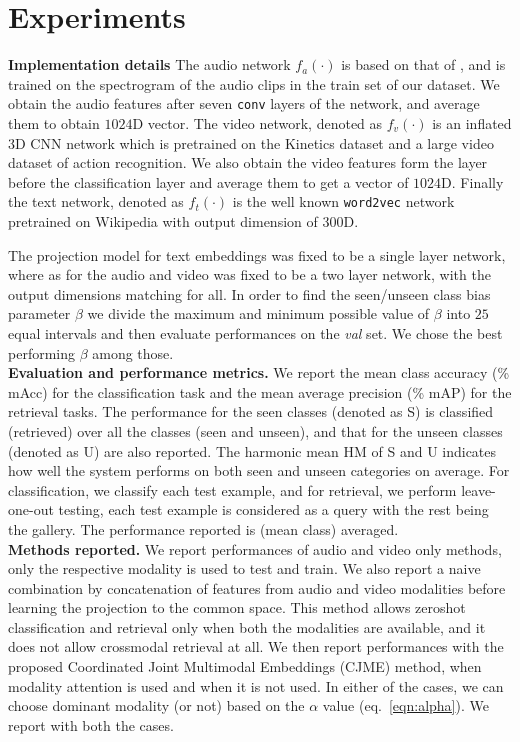 \section{Experiments}
\label{sec:experiments}
\noindent
\textbf{Implementation details}
The audio network $f_a(\cdot)$ is based on that of \cite{kumar2018knowledge}, and is trained on the spectrogram of the audio clips in the train set of our dataset. We obtain the audio features after seven \texttt{conv} layers of the network, and average them to obtain $1024$D vector. The video network, denoted as $f_v(\cdot)$ is an inflated 3D CNN network which is pretrained on the Kinetics dataset \cite{CarreiraCVPR2017} and a large video dataset of action recognition. We also obtain the  video features form the layer before the classification layer and average them to get a vector of $1024$D. Finally the text network, denoted as $f_t(\cdot)$ is the well known \texttt{word2vec} network pretrained on Wikipedia \cite{mikolov2018advances} with output dimension of $300$D.

The projection model for text embeddings was fixed to be a single layer network, where as for the audio and video was fixed to be a two layer network, with the output dimensions matching for all. In order to find the seen/unseen class bias parameter $\beta$ we divide the maximum and minimum possible value of $\beta$ into $25$ equal intervals and then evaluate performances on the \textit{val} set. We chose the best performing $\beta$ among those. 
\vspace{0.5em}\\
\textbf{Evaluation and performance metrics.}
We report the mean class accuracy (\% mAcc) for the classification task and the mean average precision (\% mAP) for the retrieval tasks. The performance for the seen classes (denoted as S) is classified (retrieved) over all the classes (seen and unseen), and that for the unseen classes (denoted as U) are also reported. The harmonic mean HM of S and U indicates how well the system performs on both seen and unseen categories on average. For classification, we classify each test example, and for retrieval, we perform leave-one-out testing, \ie each test example is considered as a query with the rest being the gallery. The performance reported is (mean class) averaged. 
\vspace{0.5em}\\
\textbf{Methods reported.}
We report performances of audio and video only methods, \ie only the respective modality is used to test and train. We also report a naive combination by concatenation of features from audio and video modalities before learning the projection to the common space. This method allows zeroshot classification and retrieval only when both the modalities are available, and it does not allow crossmodal retrieval at all. We then report performances with the proposed Coordinated Joint Multimodal Embeddings (CJME) method, when modality attention is used and when it is not used. In either of the cases, we can choose dominant modality (or not) based on the $\alpha$ value (eq.~\ref{eqn:alpha}). We report with both the cases.


